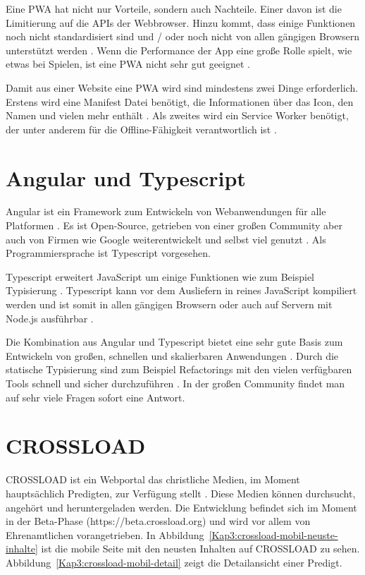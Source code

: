 Eine \ac{PWA} hat nicht nur Vorteile, sondern auch Nachteile. Einer davon ist die Limitierung auf die APIs der Webbrowser. Hinzu kommt, dass einige Funktionen noch nicht standardisiert sind und / oder noch nicht von allen gängigen Browsern unterstützt werden \autocite{majchrzak2018} \autocite{biorn2017}. Wenn die Performance der App eine große Rolle spielt, wie etwas bei Spielen, ist eine \ac{PWA} nicht sehr gut geeignet \autocite{biorn2017}.

Damit aus einer Website eine \ac{PWA} wird sind mindestens zwei Dinge erforderlich. Erstens wird eine Manifest Datei benötigt, die Informationen über das Icon, den Namen und vielen mehr enthält \autocite{Hajian2019} \autocite{Rojas2020}. Als zweites wird ein Service Worker benötigt, der unter anderem für die Offline-Fähigkeit verantwortlich ist \autocite{Rojas2020}. 


\section{Angular und Typescript}
Angular ist ein Framework zum Entwickeln von Webanwendungen für alle Platformen \autocite{angular-io}. Es ist Open-Source, getrieben von einer großen Community aber auch von Firmen wie Google weiterentwickelt und selbst viel genutzt \autocite{angular-io}. Als Programmiersprache ist Typescript vorgesehen. 

Typescript erweitert JavaScript um einige Funktionen wie zum Beispiel Typisierung \autocite{typescript-org}. Typescript kann vor dem Ausliefern in reines JavaScript kompiliert werden und ist somit in allen gängigen Browsern oder auch auf Servern mit Node.js ausführbar \autocite{typescript-org}.

Die Kombination aus Angular und Typescript bietet eine sehr gute Basis zum Entwickeln von großen, schnellen und skalierbaren Anwendungen \autocite{angular-io}. Durch die statische Typisierung sind zum Beispiel Refactorings mit den vielen verfügbaren Tools schnell und sicher durchzuführen \autocite{typescript-org} \autocite{angular-io}. In der großen Community findet man auf sehr viele Fragen sofort eine Antwort.

\section{CROSSLOAD}
CROSSLOAD ist ein Webportal das christliche Medien, im Moment hauptsächlich Predigten, zur Verfügung stellt \autocite{crossload-org}. Diese Medien können durchsucht, angehört und heruntergeladen werden. Die Entwicklung befindet sich im Moment in der Beta-Phase (https://beta.crossload.org) und wird vor allem von Ehrenamtlichen vorangetrieben. In Abbildung~\ref{Kap3:crossload-mobil-neuste-inhalte} ist die mobile Seite mit den neusten Inhalten auf CROSSLOAD zu sehen. Abbildung~\ref{Kap3:crossload-mobil-detail} zeigt die Detailansicht einer Predigt.

